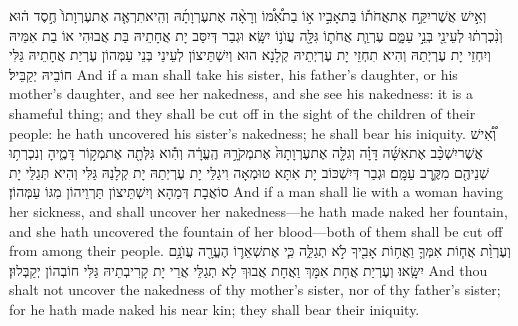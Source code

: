 {וְאִ֣ישׁ אֲשֶׁר\maqqaf יִקַּ֣ח אֶת\maqqaf אֲחֹת֡וֹ בַּת\maqqaf אָבִ֣יו א֣וֹ בַת\maqqaf אִ֠מּ֠וֹ וְרָאָ֨ה אֶת\maqqaf עֶרְוָתָ֜הּ וְהִֽיא\maqqaf תִרְאֶ֤ה אֶת\maqqaf עֶרְוָתוֹ֙ חֶ֣סֶד ה֔וּא וְנִ֨כְרְת֔וּ לְעֵינֵ֖י בְּנֵ֣י עַמָּ֑ם עֶרְוַ֧ת אֲחֹת֛וֹ גִּלָּ֖ה עֲוֺנ֥וֹ יִשָּֽׂא׃}
{וּגְבַר דְּיִסַּב יָת אֲחָתֵיהּ בַּת אֲבוּהִי אוֹ בַת אִמֵּיהּ וְיִחְזֵי יָת עֶרְיְתַהּ וְהִיא תִחְזֵי יָת עֶרְיְתֵיהּ קְלָנָא הוּא וְיִשְׁתֵּיצוֹן לְעֵינֵי בְּנֵי עַמְּהוֹן עֶרְיַת אֲחָתֵיהּ גַּלִּי חוֹבֵיהּ יְקַבֵּיל׃}
{And if a man shall take his sister, his father’s daughter, or his mother’s daughter, and see her nakedness, and she see his nakedness: it is a shameful thing; and they shall be cut off in the sight of the children of their people: he hath uncovered his sister’s nakedness; he shall bear his iniquity.}{}
{וְ֠אִ֠ישׁ אֲשֶׁר\maqqaf יִשְׁכַּ֨ב אֶת\maqqaf אִשָּׁ֜ה דָּוָ֗ה וְגִלָּ֤ה אֶת\maqqaf עֶרְוָתָהּ֙ אֶת\maqqaf מְקֹרָ֣הּ הֶֽעֱרָ֔ה וְהִ֕וא גִּלְּתָ֖ה אֶת\maqqaf מְק֣וֹר דָּמֶ֑יהָ וְנִכְרְת֥וּ שְׁנֵיהֶ֖ם מִקֶּ֥רֶב עַמָּֽם׃}
{וּגְבַר דְּיִשְׁכּוֹב יָת אִתָּא טוּמְאָה וִיגַלֵּי יָת עֶרְיְתַהּ יָת קְלָנַהּ גַּלִּי וְהִיא תְּגַלֵּי יָת סוֹאֲבָת דְּמַהָא וְיִשְׁתֵּיצוֹן תַּרְוֵיהוֹן מִגּוֹ עַמְּהוֹן׃}
{And if a man shall lie with a woman having her sickness, and shall uncover her nakedness—he hath made naked her fountain, and she hath uncovered the fountain of her blood—both of them shall be cut off from among their people.}{}
{וְעֶרְוַ֨ת אֲח֧וֹת אִמְּךָ֛ וַאֲח֥וֹת אָבִ֖יךָ לֹ֣א תְגַלֵּ֑ה כִּ֧י אֶת\maqqaf שְׁאֵר֛וֹ הֶעֱרָ֖ה עֲוֺנָ֥ם יִשָּֽׂאוּ׃}
{וְעֶרְיַת אֲחָת אִמָּךְ וַאֲחָת אֲבוּךְ לָא תְגַלֵּי אֲרֵי יָת קָרִיבְתֵיהּ גַּלִּי חוֹבְהוֹן יְקַבְּלוּן׃}
{And thou shalt not uncover the nakedness of thy mother’s sister, nor of thy father’s sister; for he hath made naked his near kin; they shall bear their iniquity.}{}
